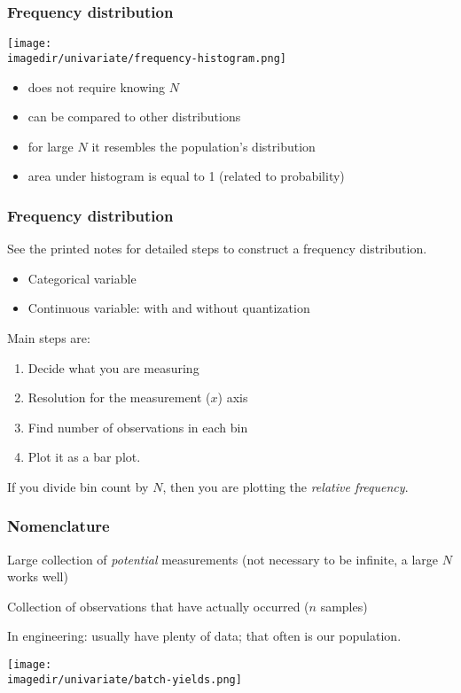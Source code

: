 \begin{frame}\frametitle{Frequency distribution}
	\begin{center}
		\texttt{[image: \\imagedir/univariate/frequency-histogram.png]}
	\end{center}
	{}
	\begin{itemize}
		\item	does not require knowing $N$
		\item	can be compared to other distributions
		\item	for large $N$ it resembles the population's distribution
		\item	area under histogram is equal to 1 (related to probability)
	\end{itemize}
\end{frame}

\begin{frame}\frametitle{Frequency distribution}

	See the printed notes for detailed steps to construct a frequency distribution.
	\begin{itemize}
		\item	Categorical variable
		\item	Continuous variable: with and without quantization
	\end{itemize}

	Main steps are:
	\begin{enumerate}
		\item	Decide what you are measuring
		\item	Resolution for the measurement ($x$) axis
		\item	Find number of observations in each bin
		\item	Plot it as a bar plot.
	\end{enumerate}

	If you divide bin count by $N$, then you are plotting the \emph{relative frequency}.
\end{frame}

\begin{frame}\frametitle{Nomenclature}
	{}

	Large collection of \emph{potential} measurements (not necessary to be infinite, a large $N$ works well)

	{}

	Collection of observations that have actually occurred ($n$ samples)

	In engineering: usually have plenty of data; that often is our population.

	\begin{center}
		\texttt{[image: \\imagedir/univariate/batch-yields.png]}
	\end{center}
\end{frame}

